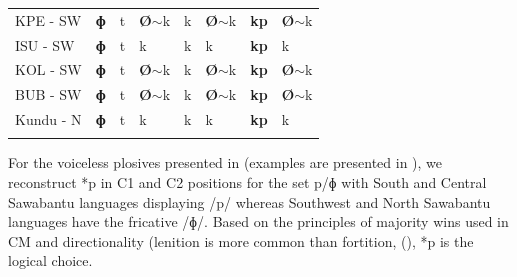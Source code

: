 \documentclass[output=paper,colorlinks,citecolor=brown
]{langscibook}
\begin{document}
\begin{table}
{\begin{tabular}{llllllll}
KPE - SW     & \textbf{ɸ}             & t             & \textbf{Ø}$\sim$k    & k                    & \textbf{Ø}$\sim$k         & \textbf{kp}                 & \textbf{Ø}$\sim$k    \\
ISU - SW     & \textbf{ɸ}             & t             & k            & k                    & k                 & \textbf{kp}                 & k            \\
KOL - SW     & \textbf{ɸ}             & t             & \textbf{Ø}$\sim$k    & k                    & \textbf{Ø}$\sim$k         & \textbf{kp}                 & \textbf{Ø}$\sim$k    \\
BUB - SW     & \textbf{ɸ}             & t             & \textbf{Ø}$\sim$k    & k                    & \textbf{Ø}$\sim$k         & \textbf{kp}                 & \textbf{Ø}$\sim$k    \\
Kundu - N    & \textbf{ɸ}             & t             & k            & k                    & k                 & \textbf{kp}                 & k            \\
   \lspbottomrule
 \end{tabular}
 }
\end{table}

For the voiceless plosives presented in  (examples are presented in ), we reconstruct *p in C1 and C2 positions for the set p/ɸ with South and Central Sawabantu languages displaying /p/ whereas Southwest and North Sawabantu languages have the fricative /ɸ/. Based on the principles of majority wins used in CM and directionality (lenition is more common than fortition, (\citealt{bybeeandeasterday2019}), *p is the logical choice. 
\end{document}
